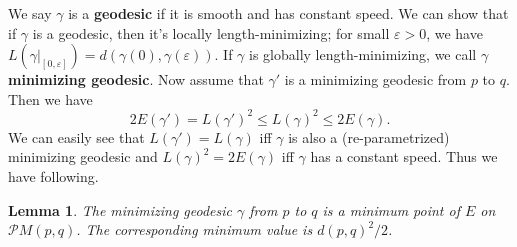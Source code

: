 \documentclass{article}
\newtheorem{lemma}[theorem]{Lemma}
\newcommand{\ep}{\varepsilon}
\newcommand{\PM}{\mathcal{P}M}
\newcommand{\g}{\gamma}
\begin{document}
We say $\g$ is a \textbf{geodesic} if it is smooth and has constant speed.
We can show that if $\g$ is a geodesic, then it's locally length-minimizing; for small $\ep>0$, we have $L(\g|_{[0,\ep]})=d(\g(0),\g(\ep))$.
If $\g$ is globally length-minimizing, we call $\g$ \textbf{minimizing geodesic}.
Now assume that $\g'$ is a minimizing geodesic from $p$ to $q$.
Then we have
	$$2E(\g')=L(\g')^2\leq L(\g)^2\leq 2E(\g).$$
We can easily see that $L(\g')=L(\g)$ iff $\g$ is also a (re-parametrized) minimizing geodesic and $L(\g)^2=2E(\g)$ iff $\g$ has a constant speed.
Thus we have following.
	\begin{lemma}\rm
	The minimizing geodesic $\g$ from $p$ to $q$ is a minimum point of $E$ on $\PM(p,q)$.
	The corresponding minimum value is $d(p,q)^2/2$.
	\end{lemma}
\end{document}
